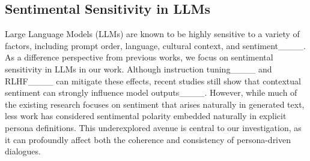 \subsection{Sentimental Sensitivity in LLMs}
\label{sec:related.3} 
Large Language Models (LLMs) are known to be highly sensitive to a variety of factors, including prompt order, language, cultural context, and sentiment____. As a difference perspective from previous works, we focus on sentimental sensitivity in LLMs in our work.
Although instruction tuning____ and RLHF____ can mitigate these effects, recent studies still show that contextual sentiment can strongly influence model outputs____. However, while much of the existing research focuses on sentiment that arises naturally in generated text, less work has considered sentimental polarity embedded naturally in explicit persona definitions. This underexplored avenue is central to our investigation, as it can profoundly affect both the coherence and consistency of persona-driven dialogues.